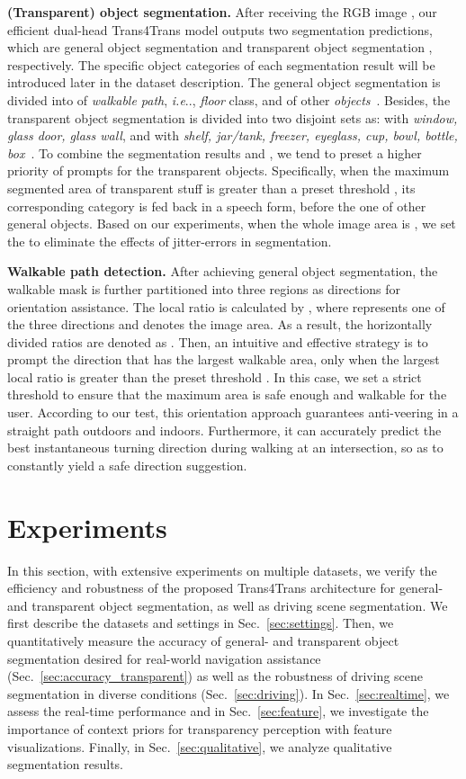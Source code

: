 \documentclass[journal]{IEEEtran}
\makeatletter
\DeclareRobustCommand\onedot{\futurelet\@let@token\@onedot}
\def\@onedot{\ifx\@let@token.\else.\null\fi\xspace}
\def\ie{\emph{i.e}\onedot} \def\Ie{\emph{I.e}\onedot}
\makeatother
\begin{document}
\noindent\textbf{(Transparent) object segmentation.}
After receiving the RGB image , our efficient dual-head Trans4Trans model outputs two segmentation predictions, which are general object segmentation  and transparent object segmentation , respectively. The specific object categories of each segmentation result will be introduced later in the dataset description. The general object segmentation is divided into  of \emph{walkable path}, \ie, \emph{floor} class, and  of other \emph{objects}~\cite{stanford2d3d}.
Besides, the transparent object segmentation is divided into two disjoint sets as:  with \emph{window, glass door, glass wall}, and  with \emph{shelf, jar/tank, freezer, eyeglass, cup, bowl, bottle, box}~\cite{xie2021segmenting}. 
To combine the segmentation results  and , we tend to preset a higher priority of prompts for the transparent objects. Specifically, when the maximum segmented area of transparent stuff is greater than a preset threshold , its corresponding category is fed back in a speech form, before the one of other general objects. Based on our experiments, when the whole image area is , we set the  to eliminate the effects of jitter-errors in segmentation.

\noindent\textbf{Walkable path detection.}
After achieving general object segmentation, the walkable mask  is further partitioned into three regions as  directions for orientation assistance. The local ratio  is calculated by , where  represents one of the three directions and  denotes the image area. As a result, the horizontally divided ratios are denoted as .
Then, an intuitive and effective strategy is to prompt the direction that has the largest walkable area, only when the largest local ratio  is greater than the preset threshold . In this case, we set a strict threshold  to ensure that the maximum area is safe enough and walkable for the user. According to our test, this orientation approach guarantees anti-veering in a straight path outdoors and indoors. Furthermore, it can accurately predict the best instantaneous turning direction during walking at an intersection, so as to constantly yield a safe direction suggestion.


\section{Experiments}
In this section, with extensive experiments on multiple datasets, we verify the efficiency and robustness of the proposed Trans4Trans architecture for general- and transparent object segmentation, as well as driving scene segmentation.
We first describe the datasets and settings in Sec.~\ref{sec:settings}. Then, we quantitatively measure the accuracy of general- and transparent object segmentation desired for real-world navigation assistance (Sec.~\ref{sec:accuracy_transparent}) as well as the robustness of driving scene segmentation in diverse conditions (Sec.~\ref{sec:driving}). In Sec.~\ref{sec:realtime}, we assess the real-time performance and in Sec.~\ref{sec:feature}, we investigate the importance of context priors for transparency perception with feature visualizations. Finally, in Sec.~\ref{sec:qualitative}, we analyze qualitative segmentation results.
\end{document}
